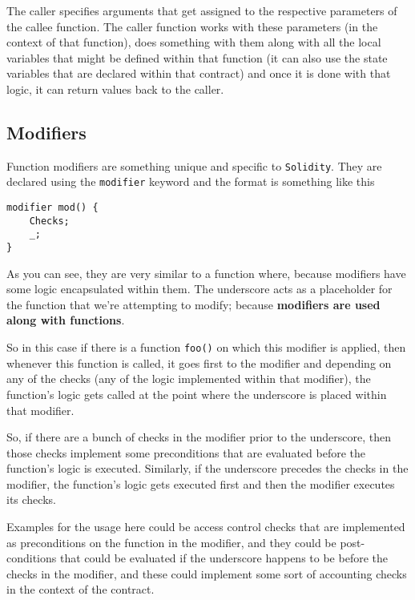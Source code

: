 The caller specifies arguments that get assigned to the respective
parameters of the callee function. The caller function works with these
parameters (in the context of that function), does something with them
along with all the local variables that might be defined within that
function (it can also use the state variables that are declared within
that contract) and once it is done with that logic, it can return values
back to the caller.

\subsection{Modifiers}\label{modifiers}

Function modifiers are something unique and specific to
\texttt{Solidity}. They are declared using the \texttt{modifier} keyword
and the format is something like this

\begin{lstlisting}[language=Solidity,numbers=none]
modifier mod() {
    Checks;
    _;
}
\end{lstlisting}

As you can see, they are very similar to a function where, because
modifiers have some logic encapsulated within them. The underscore acts
as a placeholder for the function that we're attempting to modify;
because \textbf{modifiers are used along with functions}.

So in this case if there is a function \texttt{foo()} on which this
modifier is applied, then whenever this function is called, it goes
first to the modifier and depending on any of the checks (any of the
logic implemented within that modifier), the function's logic gets
called at the point where the underscore is placed within that modifier.

So, if there are a bunch of checks in the modifier prior to the
underscore, then those checks implement some preconditions that are
evaluated before the function's logic is executed. Similarly, if the
underscore precedes the checks in the modifier, the function's logic
gets executed first and then the modifier executes its checks.

Examples for the usage here could be access control checks that are
implemented as preconditions on the function in the modifier, and they
could be post-conditions that could be evaluated if the underscore
happens to be before the checks in the modifier, and these could
implement some sort of accounting checks in the context of the contract.

